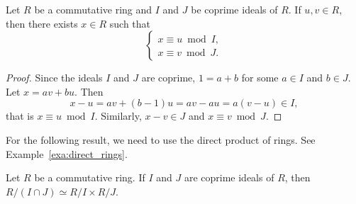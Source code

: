 


\begin{theorem}
Let $R$ be a commutative ring and $I$ and $J$ be coprime ideals of $R$. 
If $u,v\in R$, then 
there exists $x\in R$ such that 
\[
\begin{cases}	
x\equiv u\bmod I,\\
x\equiv v\bmod J.
\end{cases}
\]
\end{theorem}

\begin{proof}
Since the ideals $I$ and $J$ are coprime, $1=a+b$ for some $a\in I$ and $b\in J$. 
Let $x=av+bu$. Then
\[
x-u=av+(b-1)u=av-au=a(v-u)\in I,
\]
that is $x\equiv u\bmod I$. Similarly, $x-v\in J$ and $x\equiv v\bmod J$.  	
\end{proof}

For the following result, we need 
to use the direct product of rings. See Example~\ref{exa:direct_rings}. 

\begin{corollary}
\label{cor:chinese}
	Let $R$ be a commutative ring. If $I$ and $J$ are coprime ideals of $R$, 
	then $R/(I\cap J)\simeq R/I\times R/J$.
\end{corollary}

